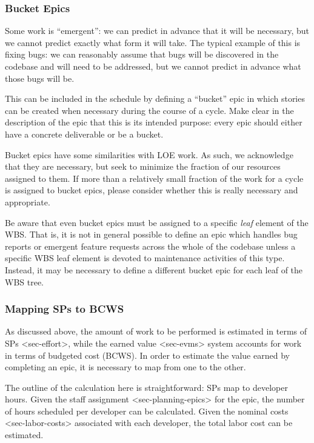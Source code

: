 \subsubsection{Bucket Epics}\label{bucket-epics}

Some work is ``emergent'': we can predict in advance that it will be
necessary, but we cannot predict exactly what form it will take. The
typical example of this is fixing bugs: we can reasonably assume that
bugs will be discovered in the codebase and will need to be addressed,
but we cannot predict in advance what those bugs will be.

This can be included in the schedule by defining a ``bucket'' epic in
which stories can be created when necessary during the course of a
cycle. Make clear in the description of the epic that this is its
intended purpose: every epic should either have a concrete deliverable
or be a bucket.

Bucket epics have some similarities with LOE work. As such, we
acknowledge that they are necessary, but seek to minimize the fraction
of our resources assigned to them. If more than a relatively small
fraction of the work for a cycle is assigned to bucket epics, please
consider whether this is really necessary and appropriate.

Be aware that even bucket epics must be assigned to a specific
\emph{leaf} element of the WBS. That is, it is not in general possible
to define an epic which handles bug reports or emergent feature requests
across the whole of the codebase unless a specific WBS leaf element is
devoted to maintenance activities of this type. Instead, it may be
necessary to define a different bucket epic for each leaf of the WBS
tree.

\subsubsection{Mapping SPs to BCWS}\label{mapping-sps-to-bcws}

As discussed above, the amount of work to be performed is estimated in
terms of SPs \textless{}sec-effort\textgreater{}, while the
earned value \textless{}sec-evms\textgreater{} system accounts for work
in terms of budgeted cost (BCWS). In order to estimate the value earned
by completing an epic, it is necessary to map from one to the other.

The outline of the calculation here is straightforward: SPs map to
developer hours. Given the
staff assignment \textless{}sec-planning-epics\textgreater{} for the
epic, the number of hours scheduled per developer can be calculated.
Given the nominal costs \textless{}sec-labor-costs\textgreater{}
associated with each developer, the total labor cost can be estimated.

